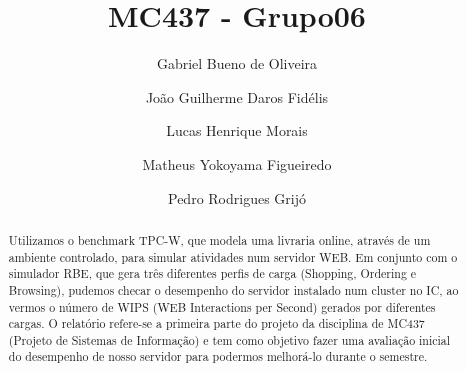 \documentclass[11pt,twoside]{article}
\begin{document}
% 

%



\TRMakeCover

%
\pagestyle{myheadings}

%
\title{MC437 - Grupo06}

\author{Gabriel Bueno de Oliveira \and
Jo{\~a}o Guilherme Daros Fid{\'e}lis \and
Lucas Henrique Morais \and
Matheus Yokoyama Figueiredo \and Pedro Rodrigues Grij{\'o}}
\date{}

\maketitle


\begin{abstract} 
\setlength{\parindent}{4ex}
  Utilizamos o benchmark TPC-W, que modela uma livraria online, atrav\'es de um ambiente controlado, para simular atividades num servidor WEB. Em conjunto com o simulador RBE, que gera tr\^es diferentes perfis de carga (Shopping, Ordering e Browsing), pudemos checar o desempenho do servidor instalado num cluster no IC, ao vermos o n\'umero de WIPS (WEB Interactions per Second) gerados por diferentes cargas. O relat\'orio refere-se a primeira parte do projeto da disciplina de MC437 (Projeto de Sistemas de Informa\c{c}\~ao) e tem como objetivo fazer uma avalia\c{c}\~ao inicial do desempenho de nosso servidor para podermos melhor\'a-lo durante o semestre.
\end{abstract}
\end{document}
